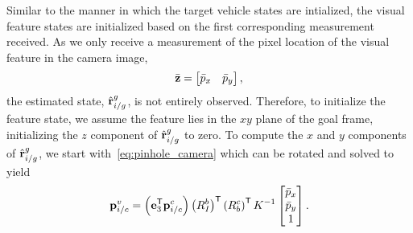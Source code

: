 Similar to the manner in which the target vehicle states are intialized,
the visual feature states are initialized based on the first corresponding measurement received.
As we only receive a measurement of the pixel
location of the visual feature in the camera image,
\begin{equation}
  \bar{\vect{z}} = \begin{bmatrix} \bar{p}_x & \bar{p}_y \end{bmatrix}
  \label{eq:pixel_meas},
\end{equation}
the estimated state, $\hat{\boldsymbol{\mathrm{r}}}_{i/g}^g$, is not entirely observed.
Therefore, to initialize
the feature state, we assume the feature lies in the $xy$ plane of the
goal frame, initializing the $z$ component of $\hat{\boldsymbol{\mathrm{r}}}_{i/g}^g$ to zero.
To compute the
$x$ and $y$ components of $\hat{\boldsymbol{\mathrm{r}}}_{i/g}^g$,
we start with~\eqref{eq:pinhole_camera}
which can be rotated and solved to yield
\begin{equation}
 \boldsymbol{\mathrm{p}}_{i/c}^v
  =
  \left( \boldsymbol{\mathrm{e}}_3^{\mathsf{T}} \boldsymbol{\mathrm{p}}_{i/c}^c \right) \left( R_I^b
  \right)^{\mathsf{T}} \left( R_b^c \right)^{\mathsf{T}} K^{-1} \begin{bmatrix}
    \bar{p}_x \\ \bar{p}_y \\ 1
  \end{bmatrix}.
\end{equation}
